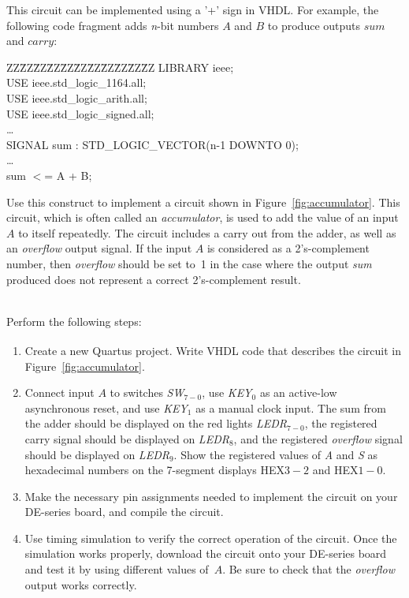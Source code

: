 \documentclass[epsfig,10pt,fullpage]{article}
\begin{document}
This circuit can be implemented using a '+' sign in VHDL. For example, the following code fragment adds {\it n}-bit numbers $A$ and $B$ to produce outputs $sum$ and $carry$:

\begin{center}
\begin{minipage}[t]{12.5 cm}
\begin{tabbing}
ZZ\=ZZ\=ZZ\=ZZ\=ZZ\=ZZ\=ZZ\=ZZ\=ZZ\=ZZ\=ZZ\kill
\>LIBRARY ieee;\\
\>USE ieee.std\_logic\_1164.all;\\
\>USE ieee.std\_logic\_arith.all;\\
\>USE ieee.std\_logic\_signed.all;\\
\>\ldots \\
\>SIGNAL sum : STD\_LOGIC\_VECTOR(n-1 DOWNTO 0);\\
\>\ldots \\
\>sum $<$= A + B;\\
\end{tabbing}
\end{minipage}
\end{center}

Use this construct to implement a circuit shown in Figure~\ref{fig:accumulator}. This
circuit, which is often called an {\it accumulator}, is used to add the value of an input
$A$ to itself repeatedly. The circuit includes a carry out from the adder, as well as an
{\it overflow} output signal. If the input $A$ is considered as a 2's-complement number, 
then {\it overflow} should be set to~1
in the case where the output {\it sum} produced does not represent a correct
2's-complement result.

~\\
Perform the following steps:
\begin{enumerate}
\item Create a new Quartus\textsuperscript{\textregistered} project. Write VHDL code that describes the 
circuit in Figure~\ref{fig:accumulator}.
\item Connect input $A$ to switches {\it SW}$_{7-0}$, use {\it KEY}$_0$ as an 
active-low asynchronous reset, and use {\it KEY}$_1$ as a manual clock input. The sum 
from the adder should be displayed on the red lights {\it LEDR}$_{7-0}$, the registered 
carry signal should be displayed on {\it LEDR}$_{8}$, and the registered {\it overflow} 
signal should be displayed on {\it LEDR}$_{9}$. Show the registered values of {\it A}
and {\it S} as hexadecimal numbers on the 7-segment displays HEX$3-2$ and HEX$1-0$. 
\item Make the necessary pin assignments needed to implement the circuit on your
DE-series board, and compile the circuit.
\item Use timing simulation to verify the correct operation of the
circuit. Once the simulation works properly, download the circuit onto your DE-series board 
and test it by using different values of~$A$. Be sure to check that the {\it overflow} 
output works correctly.
\end{enumerate}
\end{document}
